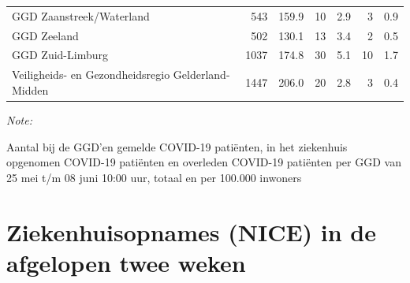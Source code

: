 \documentclass[
  english,
  man,floatsintext]{apa6}
\begin{document}
\begin{table}
\begin{threeparttable}
\begin{tabular}{lrrrrrr}
GGD Zaanstreek/Waterland & 543 & 159.9 & 10 & 2.9 & 3 & 0.9\\
GGD Zeeland & 502 & 130.1 & 13 & 3.4 & 2 & 0.5\\
GGD Zuid-Limburg & 1037 & 174.8 & 30 & 5.1 & 10 & 1.7\\
Veiligheids- en Gezondheidsregio Gelderland-Midden & 1447 & 206.0 & 20 & 2.8 & 3 & 0.4\\
\bottomrule
\end{tabular}
\begin{tablenotes}
\item \textit{Note: } 
\item Aantal bij de GGD’en gemelde COVID-19 patiënten, in het ziekenhuis opgenomen COVID-19 patiënten en overleden COVID-19 patiënten per GGD van 25 mei t/m 08 juni 10:00 uur, totaal en per 100.000 inwoners
\end{tablenotes}
\end{threeparttable}
\endgroup{}
\end{table}

\newpage

\hypertarget{ziekenhuisopnames-nice-in-de-afgelopen-twee-weken}{%
\section{Ziekenhuisopnames (NICE) in de afgelopen twee weken}\label{ziekenhuisopnames-nice-in-de-afgelopen-twee-weken}}
\end{document}
